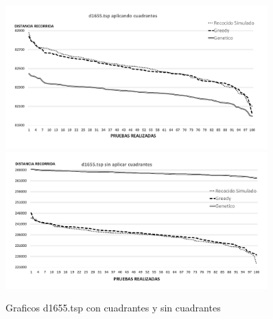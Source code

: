  \begin{figure}[hbtp]
    \centering
        \includegraphics[width=0.9\textwidth]{PruebasResultados/Experimentos_Graficos_Con/d1655.png}
        \includegraphics[width=0.9\textwidth]{PruebasResultados/Experimentos_Graficos_Sin/d1655.png}
        \caption{Graficos d1655.tsp con cuadrantes y sin cuadrantes}
        \label{fig:d1655_grafica.png}
\end{figure}
\newpage

